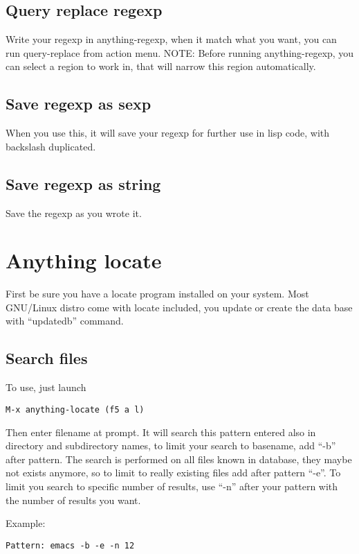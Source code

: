 \documentclass[a4paper,11pt]{article}
\begin{document}
\subsection{Query replace regexp}
\label{sec:query-replace-regexp}
Write your regexp in anything-regexp, when it match what you want,
you can run query-replace from action menu.
NOTE:
Before running anything-regexp, you can select a region to work in, that will narrow this region
automatically. 
\subsection{Save regexp as sexp}
\label{sec:save-regexp-as}
When you use this, it will save your regexp for further use in lisp code,
with backslash duplicated.

\subsection{Save regexp as string}
\label{sec:save-regexp-as-1}
Save the regexp as you wrote it.

\section{Anything locate}
\label{sec:anything-locate}
First be sure you have a locate program installed on your system.
Most GNU/Linux distro come with locate included, you update or create the data base with
``updatedb'' command.

\subsection{Search files}
\label{sec:search-files}

To use, just launch 
\begin{verbatim}
M-x anything-locate (f5 a l)
\end{verbatim}

Then enter filename at prompt.
It will search this pattern entered also in directory and subdirectory names, to limit your search to basename,
add ``-b'' after pattern.
The search is performed on all files known in database, they maybe not exists anymore, so to limit to
really existing files add after pattern ``-e''.
To limit you search to specific number of results, use ``-n'' after your pattern with the number of results
you want.

Example:
\begin{verbatim}
Pattern: emacs -b -e -n 12
\end{verbatim}
\end{document}
